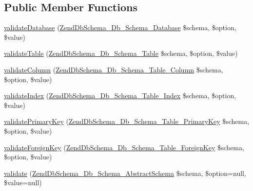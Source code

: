\subsection*{\-Public \-Member \-Functions}
\begin{DoxyCompactItemize}
\item 
\hyperlink{classZendDbSchema__Db__Schema__Validator__AbstractValidator_abb84d37eb5e10ce0549831b7ad9d13f4}{validate\-Database} (\hyperlink{classZendDbSchema__Db__Schema__Database}{\-Zend\-Db\-Schema\-\_\-\-Db\-\_\-\-Schema\-\_\-\-Database} \$schema, \$option, \$value)
\item 
\hyperlink{classZendDbSchema__Db__Schema__Validator__AbstractValidator_a097f3953952902e3a2d48e200427ed8b}{validate\-Table} (\hyperlink{classZendDbSchema__Db__Schema__Table}{\-Zend\-Db\-Schema\-\_\-\-Db\-\_\-\-Schema\-\_\-\-Table} \$schema, \$option, \$value)
\item 
\hyperlink{classZendDbSchema__Db__Schema__Validator__AbstractValidator_a676a382f8473dc61a6f037c768d18d67}{validate\-Column} (\hyperlink{classZendDbSchema__Db__Schema__Table__Column}{\-Zend\-Db\-Schema\-\_\-\-Db\-\_\-\-Schema\-\_\-\-Table\-\_\-\-Column} \$schema, \$option, \$value)
\item 
\hyperlink{classZendDbSchema__Db__Schema__Validator__AbstractValidator_ad23ee9d8c93ea569ed25aaf27b306a1a}{validate\-Index} (\hyperlink{classZendDbSchema__Db__Schema__Table__Index}{\-Zend\-Db\-Schema\-\_\-\-Db\-\_\-\-Schema\-\_\-\-Table\-\_\-\-Index} \$schema, \$option, \$value)
\item 
\hyperlink{classZendDbSchema__Db__Schema__Validator__AbstractValidator_a9f62f245e92b12be87b633dfb5810470}{validate\-Primary\-Key} (\hyperlink{classZendDbSchema__Db__Schema__Table__PrimaryKey}{\-Zend\-Db\-Schema\-\_\-\-Db\-\_\-\-Schema\-\_\-\-Table\-\_\-\-Primary\-Key} \$schema, \$option, \$value)
\item 
\hyperlink{classZendDbSchema__Db__Schema__Validator__AbstractValidator_a0fa9765711f41a11dd69511b9d1cc11b}{validate\-Foreign\-Key} (\hyperlink{classZendDbSchema__Db__Schema__Table__ForeignKey}{\-Zend\-Db\-Schema\-\_\-\-Db\-\_\-\-Schema\-\_\-\-Table\-\_\-\-Foreign\-Key} \$schema, \$option, \$value)
\item 
\hyperlink{classZendDbSchema__Db__Schema__Validator__AbstractValidator_a86b603d430092a56aaa126f1194b317b}{validate} (\hyperlink{classZendDbSchema__Db__Schema__AbstractSchema}{\-Zend\-Db\-Schema\-\_\-\-Db\-\_\-\-Schema\-\_\-\-Abstract\-Schema} \$schema, \$option=null, \$value=null)
\end{DoxyCompactItemize}


